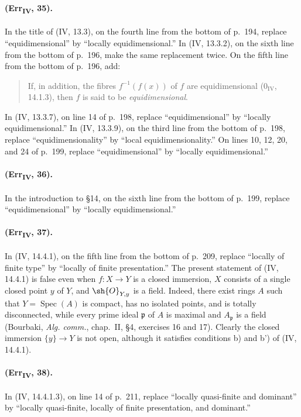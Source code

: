 {\paragraph{(Err\textsubscript{IV}, 35).}
In the title of (IV, 13.3), on the fourth line from the bottom of p.~194,
replace ``equidimensional'' by ``locally equidimensional.''  In
(IV, 13.3.2), on the sixth line from the bottom of p.~196, make the same
replacement twice.  On the fifth line from the bottom of p.~196, add:
\begin{quote}
If, in addition, the fibres $f^{-1}(f(x))$ of $f$ are equidimensional
($0_{\mathrm{IV}}$, 14.1.3), then $f$ is said to be
\emph{equidimensional}.
\end{quote}
In (IV, 13.3.7), on line 14 of p.~198, replace ``equidimensional'' by
``locally equidimensional.''  In (IV, 13.3.9), on the third line from
the bottom of p.~198, replace ``equidimensionality'' by ``local
equidimensionality.''  On lines 10, 12, 20, and 24 of p.~199, replace
``equidimensional'' by ``locally equidimensional.''

\paragraph{(Err\textsubscript{IV}, 36).}
In the introduction to \S14, on the sixth line from the bottom of
p.~199, replace ``equidimensional'' by ``locally equidimensional.''

\paragraph{(Err\textsubscript{IV}, 37).}
In (IV, 14.4.1), on the fifth line from the bottom of p.~209, replace
``locally of finite type'' by ``locally of finite presentation.''  The
present statement of (IV, 14.4.1) is false even when $f:X\to Y$ is a
closed immersion, $X$ consists of a single closed point $y$ of $Y$, and
$\sh{O}_{Y,y}$ is a field.  Indeed, there exist rings $A$ such that
$Y=\operatorname{Spec}(A)$ is compact, has no isolated points, and is
totally disconnected, while every prime ideal $\mathfrak p$ of $A$ is
maximal and $A_\mathfrak p$ is a field (Bourbaki,
\emph{Alg. comm.}, chap.~II, \S4, exercises 16 and 17).  Clearly the
closed immersion $\{y\}\to Y$ is not open, although it satisfies
conditions b) and b') of (IV, 14.4.1).

\paragraph{(Err\textsubscript{IV}, 38).}
In (IV, 14.4.1.3), on line 14 of p.~211, replace ``locally quasi-finite
and dominant'' by ``locally quasi-finite, locally of finite presentation,
and dominant.''

}
